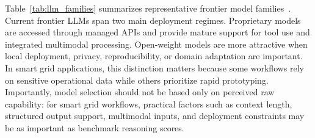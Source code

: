 \documentclass[journal,onecolumn]{IEEEtran} %
\begin{document}
Table~\ref{tab:llm_families} summarizes representative frontier model families~\cite{openai_gpt54_2026,anthropic_sonnet46_2026,google_gemini31pro_2026,xai_grok420_2026,meta_llama4scout_2026,deepseek_r1_2025,qwen_qwen3instruct2507_2025,mistral_large3_2025}. Current frontier LLMs span two main deployment regimes. Proprietary models are accessed through managed APIs and provide mature support for tool use and integrated multimodal processing. Open-weight models are more attractive when local deployment, privacy, reproducibility, or domain adaptation are important. In smart grid applications, this distinction matters because some workflows rely on sensitive operational data while others prioritize rapid prototyping. Importantly, model selection should not be based only on perceived raw capability: for smart grid workflows, practical factors such as context length, structured output support, multimodal inputs, and deployment constraints may be as important as benchmark reasoning scores.


\end{document}
